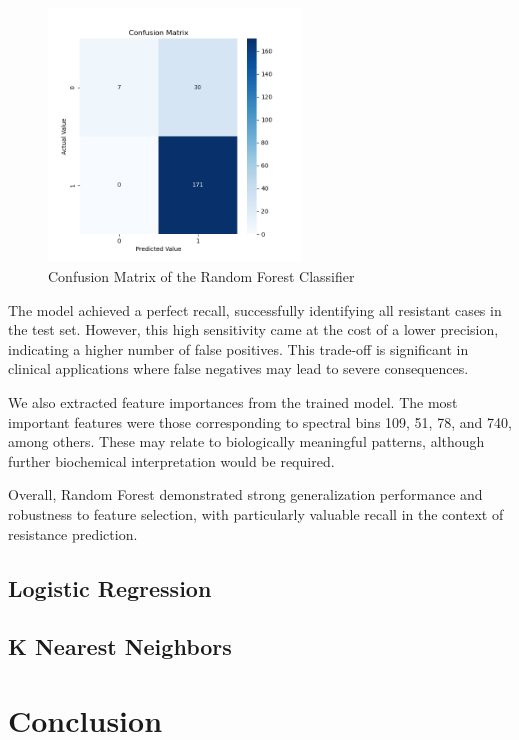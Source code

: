 \documentclass{article}
\begin{document}
\begin{figure}[h]
  \centering
  \includegraphics[width=0.6\textwidth]{confusion_matrix_Random_Forest.png}
  \vspace{-1em}
  \caption{Confusion Matrix of the Random Forest Classifier}
\end{figure}

The model achieved a perfect recall, successfully identifying all resistant cases in the test set. However, this high sensitivity came at the cost of a lower precision, indicating a higher number of false positives. This trade-off is significant in clinical applications where false negatives may lead to severe consequences. 

We also extracted feature importances from the trained model. The most important features were those corresponding to spectral bins 109, 51, 78, and 740, among others. These may relate to biologically meaningful patterns, although further biochemical interpretation would be required.

Overall, Random Forest demonstrated strong generalization performance and robustness to feature selection, with particularly valuable recall in the context of resistance prediction.

\subsection{Logistic Regression}

\subsection{K Nearest Neighbors}

\section{Conclusion}





\end{document}
